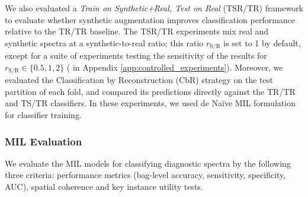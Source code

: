 \documentclass[12pt]{article}
\theoremstyle{paper}
\begin{document}
We also evaluated a \emph{Train on Synthetic+Real, Test on Real} (TSR/TR) framework to evaluate whether synthetic augmentation improves classification performance relative to the TR/TR baseline. The TSR/TR experiments mix real and synthetic spectra at a synthetic-to-real ratio; this ratio $r_{\text{S/R}}$ is set to 1 by default, except for a suite of experiments testing the sensitivity of the results for $r_{\text{S/R}} \in \{0.5, 1, 2\}$ ( in Appendix \ref{app:controlled_experiments}). Moreover, we evaluated the Classification by Reconstruction (CbR) strategy on the test partition of each fold, and compared its predictions directly against the TR/TR and TS/TR classifiers. In these experiments, we used de Naïve MIL formulation for classifier training. 

\subsubsection{MIL Evaluation}
We evaluate the MIL models for classifying diagnostic spectra by the following three criteria: performance metrics (bag-level accuracy, sensitivity, specificity, AUC), spatial coherence and key instance utility tests.
\end{document}
